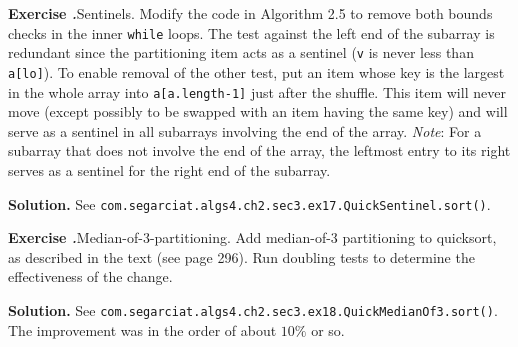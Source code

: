 \documentclass[12pt, a4paper]{article}
\newenvironment{ex}[2][Exercise]
{\par\medskip\noindent \textbf{#1 #2.}}
{\medskip}
\newenvironment{sol}[1][Solution]
{\par\medskip\noindent \textbf{#1.} }
{\medskip}
\begin{document}
	\begin{ex}{17}
		\emph{Sentinels}. Modify the code in Algorithm 2.5 to remove both bounds checks in the
		inner \texttt{while} loops. The test against the left end of the subarray is redundant
		since the partitioning item acts as a sentinel (\texttt{v} is never less than
		\texttt{a[lo]}). To enable removal of the other test, put an item whose key is the
		largest in the whole array into \texttt{a[a.length-1]} just after the shuffle. This
		item will  never move (except possibly to be swapped with an item having the same key)
		and will serve as a sentinel in all subarrays involving the end of the array.
		\emph{Note}: For a subarray that does not involve the end of the array, the leftmost
		entry to its right serves as a sentinel for the right end of the subarray.
	\end{ex}
	\begin{sol}
		See \texttt{com.segarciat.algs4.ch2.sec3.ex17.QuickSentinel.sort()}.
	\end{sol}
	\begin{ex}{18}
		\emph{Median-of-3-partitioning}. Add median-of-3 partitioning to quicksort, as described
		in the text (see page 296). Run doubling tests to determine the effectiveness of
		the change.
	\end{ex}
	\begin{sol}
		See \texttt{com.segarciat.algs4.ch2.sec3.ex18.QuickMedianOf3.sort()}.
		The improvement was in the order of about $10\%$ or so.
	\end{sol}
	\pagebreak
	\printbibliography
\end{document}
